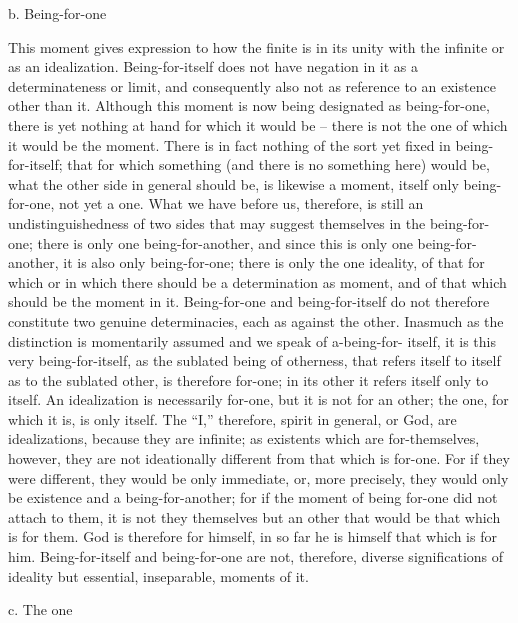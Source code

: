 b. Being-for-one

This moment gives expression to how the finite is in its unity with the
infinite or as an idealization.
Being-for-itself does not have negation in it as
a determinateness or limit, and consequently also not as
reference to an existence other than it.
Although this moment is now being designated
as being-for-one, there is yet nothing at hand for which it would be –
there is not the one of which it would be the moment.
There is in fact nothing of the sort yet fixed in being-for-itself;
that for which something (and there is no something here)
would be, what the other side in general should be,
is likewise a moment, itself only being-for-one, not yet a one.
What we have before us, therefore, is still an undistinguishedness of two
sides that may suggest themselves in the being-for-one; there is only one
being-for-another, and since this is only one being-for-another, it is also only
being-for-one; there is only the one ideality, of that for which or in which
there should be a determination as moment, and of that which should
be the moment in it.
Being-for-one and being-for-itself do not therefore
constitute two genuine determinacies, each as against the other. Inasmuch
as the distinction is momentarily assumed and we speak of a-being-for-
itself, it is this very being-for-itself, as the sublated being of otherness,
that refers itself to itself as to the sublated other, is therefore for-one; in
its other it refers itself only to itself. An idealization is necessarily for-one,
but it is not for an other; the one, for which it is, is only itself.
The “I,” therefore, spirit in general, or God, are idealizations,
because they are infinite; as existents which are for-themselves, however,
they are not ideationally different from that which is for-one.
For if they were different, they would be only immediate, or, more precisely, they would only be
existence and a being-for-another; for if the moment of being for-one did
not attach to them, it is not they themselves but an other that would be
that which is for them.
God is therefore for himself, in so far he is himself
that which is for him.
Being-for-itself and being-for-one are not, therefore, diverse significations of
ideality but essential, inseparable, moments of it.

c. The one

